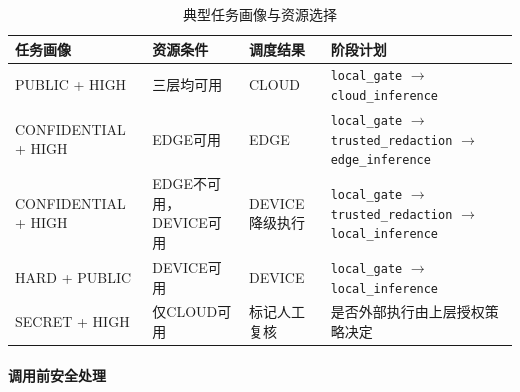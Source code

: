 \begin{table}[htbp]
    \centering
    \caption{典型任务画像与资源选择}
    \label{tab:placement-cases}
    \begin{tabularx}{\textwidth}{p{}p{}p{}X}
        \toprule
        任务画像 & 资源条件 & 调度结果 & 阶段计划 \\
        \midrule
        PUBLIC + HIGH
        & 三层均可用
        & CLOUD
        & \texttt{local\_gate} $\rightarrow$ \texttt{cloud\_inference} \\

        CONFIDENTIAL + HIGH
        & EDGE可用
        & EDGE
        & \texttt{local\_gate} $\rightarrow$ \texttt{trusted\_redaction}
          $\rightarrow$ \texttt{edge\_inference} \\

        CONFIDENTIAL + HIGH
        & EDGE不可用，DEVICE可用
        & DEVICE降级执行
        & \texttt{local\_gate} $\rightarrow$ \texttt{trusted\_redaction}
          $\rightarrow$ \texttt{local\_inference} \\

        HARD + PUBLIC
        & DEVICE可用
        & DEVICE
        & \texttt{local\_gate} $\rightarrow$ \texttt{local\_inference} \\

        SECRET + HIGH
        & 仅CLOUD可用
        & 标记人工复核
        & 是否外部执行由上层授权策略决定 \\
        \bottomrule
    \end{tabularx}
\end{table}

\paragraph{调用前安全处理}




